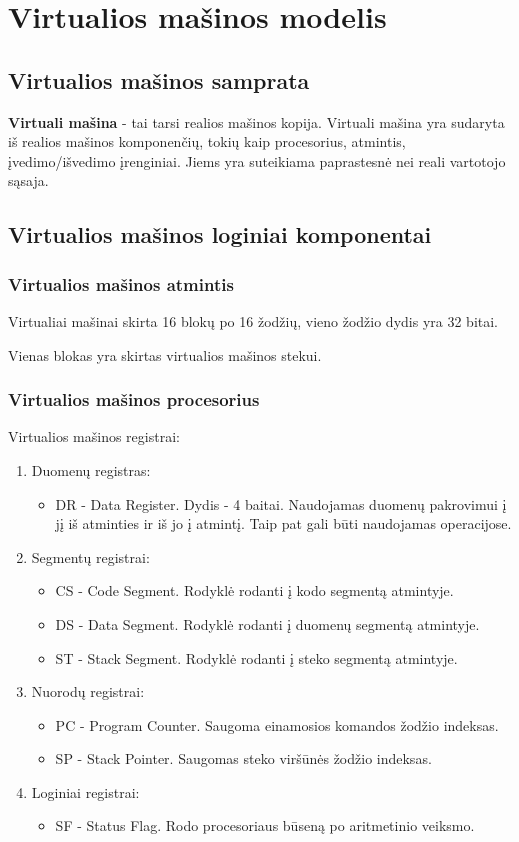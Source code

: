 \section{Virtualios mašinos modelis}
	\subsection{Virtualios mašinos samprata}
	\textbf{Virtuali mašina} - tai tarsi realios mašinos kopija. Virtuali mašina yra sudaryta iš realios mašinos komponenčių, tokių kaip procesorius, atmintis, įvedimo/išvedimo įrenginiai. Jiems yra suteikiama paprastesnė nei reali vartotojo sąsaja.
	
	\subsection{Virtualios mašinos loginiai komponentai}
	\subsubsection{Virtualios mašinos atmintis}
	Virtualiai mašinai skirta 16 blokų po 16 žodžių, vieno žodžio dydis yra 32 bitai.
	
	Vienas blokas yra skirtas virtualios mašinos stekui.
	\subsubsection{Virtualios mašinos procesorius}
	Virtualios mašinos registrai:
	\begin{enumerate}
	\item Duomenų registras: 
		\begin{itemize}
		\item DR - Data Register. Dydis - 4 baitai. Naudojamas duomenų pakrovimui į jį iš atminties ir iš jo į atmintį. Taip pat gali būti naudojamas operacijose.
		\end{itemize}
	\item Segmentų registrai:
		\begin{itemize}
		\item CS - Code Segment. Rodyklė rodanti į kodo segmentą atmintyje.
		\item DS - Data Segment. Rodyklė rodanti į duomenų segmentą atmintyje.
		\item ST - Stack Segment. Rodyklė rodanti į steko segmentą atmintyje.
		\end{itemize}
	\item Nuorodų registrai:
		\begin{itemize}
		\item PC - Program Counter. Saugoma einamosios komandos žodžio indeksas.
		\item SP - Stack Pointer. Saugomas steko viršūnės žodžio indeksas.
		\end{itemize}
	\item Loginiai registrai:
		\begin{itemize}
		\item SF - Status Flag. Rodo procesoriaus būseną po aritmetinio veiksmo.
		\end{itemize}
	\end{enumerate}
